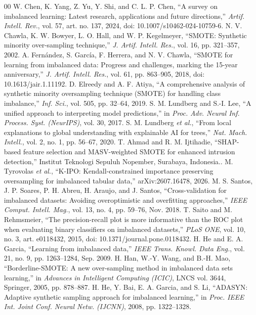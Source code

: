 \documentclass[conference]{IEEEtran}
\begin{document}
\begin{thebibliography}{00}
 W. Chen, K. Yang, Z. Yu, Y. Shi, and C. L. P. Chen, ``A survey on imbalanced learning: Latest research, applications and future directions,'' \emph{Artif. Intell. Rev.}, vol. 57, art. no. 137, 2024, doi: 10.1007/s10462-024-10759-6.
 N. V. Chawla, K. W. Bowyer, L. O. Hall, and W. P. Kegelmeyer, ``SMOTE: Synthetic minority over-sampling technique,'' \emph{J. Artif. Intell. Res.}, vol. 16, pp. 321--357, 2002.
 A. Fern\'andez, S. Garc\'ia, F. Herrera, and N. V. Chawla, ``SMOTE for learning from imbalanced data: Progress and challenges, marking the 15-year anniversary,'' \emph{J. Artif. Intell. Res.}, vol. 61, pp. 863--905, 2018, doi: 10.1613/jair.1.11192.
 D. Elreedy and A. F. Atiya, ``A comprehensive analysis of synthetic minority oversampling technique (SMOTE) for handling class imbalance,'' \emph{Inf. Sci.}, vol. 505, pp. 32--64, 2019.
 S. M. Lundberg and S.-I. Lee, ``A unified approach to interpreting model predictions,'' in \emph{Proc. Adv. Neural Inf. Process. Syst. (NeurIPS)}, vol. 30, 2017.
 S. M. Lundberg \emph{et al.}, ``From local explanations to global understanding with explainable AI for trees,'' \emph{Nat. Mach. Intell.}, vol. 2, no. 1, pp. 56--67, 2020.
 T. Ahmad and R. M. Ijtihadie, ``SHAP-based feature selection and MASV-weighted SMOTE for enhanced intrusion detection,'' Institut Teknologi Sepuluh Nopember, Surabaya, Indonesia..
 M. Tyrovolas \emph{et al.}, ``K-IPO: Kendall-constrained importance preserving oversampling for imbalanced tabular data,'' arXiv:2607.16478, 2026.
 M. S. Santos, J. P. Soares, P. H. Abreu, H. Araujo, and J. Santos, ``Cross-validation for imbalanced datasets: Avoiding overoptimistic and overfitting approaches,'' \emph{IEEE Comput. Intell. Mag.}, vol. 13, no. 4, pp. 59--76, Nov. 2018.
 T. Saito and M. Rehmsmeier, ``The precision-recall plot is more informative than the ROC plot when evaluating binary classifiers on imbalanced datasets,'' \emph{PLoS ONE}, vol. 10, no. 3, art. e0118432, 2015, doi: 10.1371/journal.pone.0118432.
 H. He and E. A. Garcia, ``Learning from imbalanced data,'' \emph{IEEE Trans. Knowl. Data Eng.}, vol. 21, no. 9, pp. 1263--1284, Sep. 2009.
 H. Han, W.-Y. Wang, and B.-H. Mao, ``Borderline-SMOTE: A new over-sampling method in imbalanced data sets learning,'' in \emph{Advances in Intelligent Computing (ICIC)}, LNCS vol. 3644, Springer, 2005, pp. 878--887.
 H. He, Y. Bai, E. A. Garcia, and S. Li, ``ADASYN: Adaptive synthetic sampling approach for imbalanced learning,'' in \emph{Proc. IEEE Int. Joint Conf. Neural Netw. (IJCNN)}, 2008, pp. 1322--1328.

\end{thebibliography}
\end{document}
